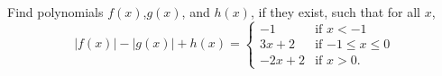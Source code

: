 Find polynomials $f(x)$,$g(x)$, and $h(x)$, if they exist, such
that for all $x$,
\[
|f(x)|-|g(x)|+h(x) = \begin{cases} -1 & \mbox{if $x<-1$} \\
                     3x+2 & \mbox{if $-1 \leq x \leq 0$} \\
                     -2x+2 & \mbox{if $x>0$.}
                     \end{cases}
\]
